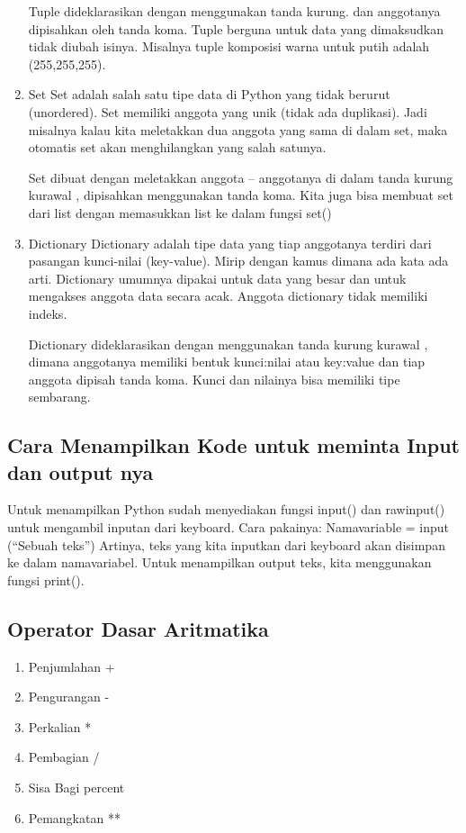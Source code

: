 \begin{enumerate}
Tuple dideklarasikan dengan menggunakan tanda kurung. dan anggotanya dipisahkan oleh tanda koma. Tuple berguna untuk data yang dimaksudkan tidak diubah isinya. Misalnya tuple komposisi warna untuk putih adalah (255,255,255).

\item Set
Set adalah salah satu tipe data di Python yang tidak berurut (unordered). Set memiliki anggota yang unik (tidak ada duplikasi). Jadi misalnya kalau kita meletakkan dua anggota yang sama di dalam set, maka otomatis set akan menghilangkan yang salah satunya.

Set dibuat dengan meletakkan anggota – anggotanya di dalam tanda kurung kurawal { }, dipisahkan menggunakan tanda koma. Kita juga bisa membuat set dari list dengan memasukkan list ke dalam fungsi set()

\item Dictionary
Dictionary adalah tipe data yang tiap anggotanya terdiri dari pasangan kunci-nilai (key-value). Mirip dengan kamus dimana ada kata ada arti. Dictionary umumnya dipakai untuk data yang besar dan untuk mengakses anggota data secara acak. Anggota dictionary tidak memiliki indeks.

Dictionary dideklarasikan dengan menggunakan tanda kurung kurawal { }, dimana anggotanya memiliki bentuk kunci:nilai atau key:value dan tiap anggota dipisah tanda koma. Kunci dan nilainya bisa memiliki tipe sembarang.
\end{enumerate}

\subsection{Cara Menampilkan Kode untuk meminta Input dan output nya}

Untuk menampilkan Python sudah menyediakan fungsi input() dan rawinput() untuk mengambil inputan dari keyboard.
Cara pakainya: 
Namavariable = input (“Sebuah teks”)
Artinya, teks yang kita inputkan dari keyboard akan disimpan ke dalam namavariabel.
Untuk menampilkan output teks, kita menggunakan fungsi print().

\subsection{Operator Dasar Aritmatika}

\begin{enumerate}
\item Penjumlahan	+
\item Pengurangan	-
\item Perkalian	*
\item Pembagian	/
\item Sisa Bagi	percent
\item Pemangkatan	**
\end{enumerate}

